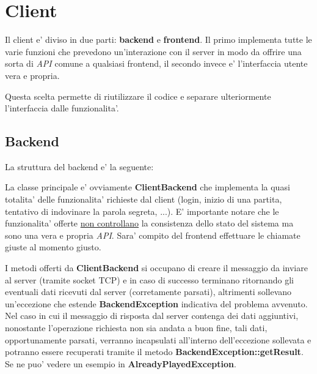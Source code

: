 \section{Client}

Il client e' diviso in due parti: \textbf{backend} e \textbf{frontend}. Il primo implementa tutte le varie funzioni che prevedono un'interazione con il server in modo da offrire una sorta di \emph{API} comune a qualsiasi frontend, il secondo invece e' l'interfaccia utente vera e propria.

Questa scelta permette di riutilizzare il codice e separare ulteriormente l'interfaccia dalle funzionalita'.

\newpage

\subsection{Backend}

La struttura del backend e' la seguente:
\bigskip

\bigskip

La classe principale e' ovviamente \textbf{ClientBackend} che implementa la quasi totalita' delle funzionalita' richieste dal client (login, inizio di una partita, tentativo di indovinare la parola segreta, ...). E' importante notare che le funzionalita' offerte \underline{non controllano} la consistenza dello stato del sistema ma sono una vera e propria \emph{API}. Sara' compito del frontend effettuare le chiamate giuste al momento giusto.

I metodi offerti da \textbf{ClientBackend} si occupano di creare il messaggio da inviare al server (tramite socket TCP) e in caso di successo terminano ritornando gli eventuali dati ricevuti dal server (corretamente parsati), altrimenti sollevano un'eccezione che estende \textbf{BackendException} indicativa del problema avvenuto. Nel caso in cui il messaggio di risposta dal server contenga dei dati aggiuntivi, nonostante l'operazione richiesta non sia andata a buon fine, tali dati, opportunamente parsati, verranno incapsulati all'interno dell'eccezione sollevata e potranno essere recuperati tramite il metodo \textbf{BackendException::getResult}. Se ne puo' vedere un esempio in \textbf{AlreadyPlayedException}.

